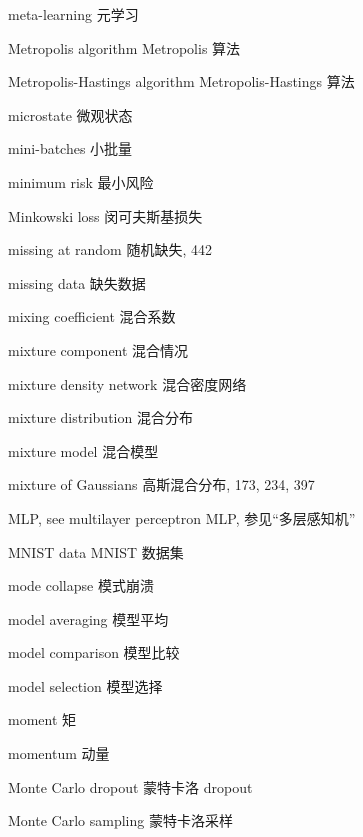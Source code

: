 meta-learning  元学习 \par
Metropolis algorithm  Metropolis 算法 \par
Metropolis-Hastings algorithm  Metropolis-Hastings 算法 \par
microstate  微观状态 \par
mini-batches  小批量 \par
minimum risk  最小风险 \par
Minkowski loss  闵可夫斯基损失 \par
missing at random  随机缺失, 442 \par
missing data  缺失数据 \par
mixing coefficient  混合系数 \par
mixture component  混合情况 \par
mixture density network  混合密度网络 \par
mixture distribution  混合分布 \par
mixture model  混合模型 \par
mixture of Gaussians  高斯混合分布, 173, 234, 397 \par
MLP, see multilayer perceptron  MLP, 参见“多层感知机” \par
MNIST data  MNIST 数据集 \par
mode collapse  模式崩溃 \par
model averaging  模型平均 \par
model comparison  模型比较 \par
model selection  模型选择 \par
moment  矩 \par
momentum  动量 \par
Monte Carlo dropout  蒙特卡洛 dropout \par
Monte Carlo sampling  蒙特卡洛采样 \par

